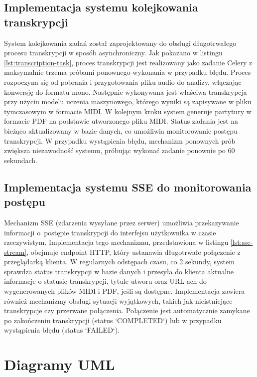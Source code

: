 \documentclass[a4paper,twoside,12pt]{book}
\begin{document}
  

\subsection{Implementacja systemu kolejkowania transkrypcji}
                
System kolejkowania zadań został zaprojektowany do obsługi długotrwałego procesu transkrypcji w sposób asynchroniczny. Jak pokazano w listingu \ref{lst:transcription-task}, proces transkrypcji jest realizowany jako zadanie Celery z maksymalnie trzema próbami ponownego wykonania w przypadku błędu. Proces rozpoczyna się od pobrania i przygotowania pliku audio do analizy, włączając konwersję do formatu mono. Następnie wykonywana jest właściwa transkrypcja przy użyciu modelu uczenia maszynowego, którego wyniki są zapisywane w pliku tymczasowym w formacie MIDI. W kolejnym kroku system generuje partytury w formacie PDF na podstawie utworzonego pliku MIDI. Status zadania jest na bieżąco aktualizowany w bazie danych, co umożliwia monitorowanie postępu transkrypcji. W przypadku wystąpienia błędu, mechanizm ponownych prób zwiększa niezawodność systemu, próbując wykonać zadanie ponownie po 60 sekundach.
                

\subsection{Implementacja systemu SSE do monitorowania postępu}

Mechanizm SSE (zdarzenia wysyłane przez serwer) umożliwia przekazywanie informacji o~postępie transkrypcji do interfejsu użytkownika w czasie rzeczywistym. Implementacja tego mechanizmu, przedstawiona w listingu \ref{lst:sse-stream}, obejmuje endpoint HTTP, który ustanawia długotrwałe połączenie z przeglądarką klienta. W regularnych odstępach czasu, co 2 sekundy, system sprawdza status transkrypcji w bazie danych i przesyła do klienta aktualne informacje o statusie transkrypcji, tytule utworu oraz URL-ach do wygenerowanych plików MIDI i PDF, jeśli są dostępne. Implementacja zawiera również mechanizmy obsługi sytuacji wyjątkowych, takich jak nieistniejące transkrypcje czy przerwane połączenia. Połączenie jest automatycznie zamykane po zakończeniu transkrypcji (status `COMPLETED`) lub w przypadku wystąpienia błędu (status `FAILED`).



\section{Diagramy UML}
\end{document}
